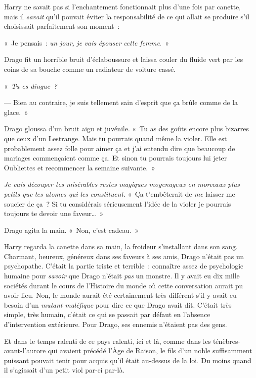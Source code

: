 Harry ne savait pas si l'enchantement fonctionnait plus d'une fois par canette, mais il \emph{savait} qu'il pouvait éviter la responsabilité de ce qui allait se produire s'il choisissait parfaitement son moment~:

«~Je pensais~: \emph{un jour, je vais épouser cette femme.}~»

Drago fit un horrible bruit d'éclaboussure et laissa couler du fluide vert par les coins de sa bouche comme un radiateur de voiture cassé.

«~\emph{Tu es dingue~?}

--- Bien au contraire, je suis tellement sain d'esprit que ça brûle comme de la glace.~»

Drago gloussa d'un bruit aigu et juvénile. «~Tu as des goûts encore plus bizarres que ceux d'un Lestrange. Mais tu pourrais quand même la violer. Elle est probablement assez folle pour aimer ça et j'ai entendu dire que beaucoup de mariages commençaient comme ça. Et sinon tu pourrais toujours lui jeter Oubliettes et recommencer la semaine suivante.~»

\emph{Je vais découper tes misérables restes magiques moyenageux en morceaux plus petits que les atomes qui les constituent.} «~Ça t'embêterait de \emph{me} laisser me soucier de ça~? Si tu considérais sérieusement l'idée de la violer je pourrais toujours te devoir une faveur…~»

Drago agita la main. «~Non, c'est cadeau.~»

Harry regarda la canette dans sa main, la froideur s'installant dans son sang. Charmant, heureux, généreux dans ses faveurs à ses amis, Drago n'était pas un psychopathe. C'était la partie triste et terrible~: connaître assez de psychologie humaine pour \emph{savoir} que Drago n'était \emph{pas} un monstre. Il y avait eu dix mille sociétés durant le cours de l'Histoire du monde où cette conversation aurait pu avoir lieu. Non, le monde aurait été certainement très différent s'il y avait eu besoin d'un \emph{mutant maléfique} pour dire ce que Drago avait dit. C'était très simple, très humain, c'était ce qui se passait par défaut en l'absence d'intervention extérieure. Pour Drago, ses ennemis n'étaient pas des gens.

Et dans le temps ralenti de ce pays ralenti, ici et là, comme dans les ténèbres-avant-l'aurore qui avaient précédé l'Âge de Raison, le fils d'un noble suffisamment puissant pouvait tenir pour acquis qu'il était au-dessus de la loi. Du moins quand il s'agissait d'un petit viol par-ci par-là.

